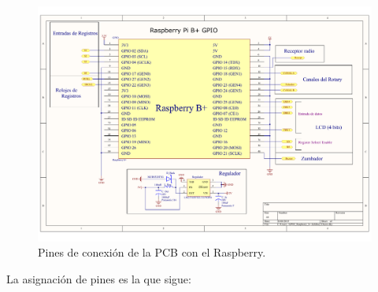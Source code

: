 \begin{figure}[H]
	\noindent \begin{centering}
		\includegraphics[width=\linewidth]{capitulo3/pcb_gpio}
		\par\end{centering}
	\smallskip
	\caption{\label{fig:pcb_gpio} Pines de conexión de la PCB con el Raspberry.}
\end{figure}

\smallskip

La asignación de pines es la que sigue:

\smallskip

